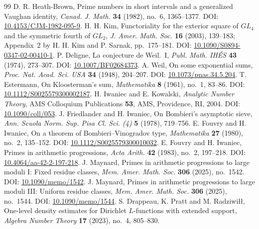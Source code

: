 \documentclass{amsart}
\numberwithin{equation}{section}
\theoremstyle{definition}
\theoremstyle{plain}
\begin{document}
\begin{thebibliography}{99}
 D. R. Heath-Brown,
Prime numbers in short intervals and a generalized Vaughan identity,
\emph{Canad. J. Math.} \textbf{34} (1982), no.~6, 1365--1377.
DOI: \href{https://doi.org/10.4153/CJM-1982-095-9}{10.4153/CJM-1982-095-9}.
 H. H. Kim,
Functoriality for the exterior square of $GL_4$ and the symmetric fourth of $GL_2$,
\emph{J. Amer. Math. Soc.} \textbf{16} (2003), 139--183;
Appendix~2 by H. H. Kim and P. Sarnak, pp.~175--181.
DOI: \href{https://doi.org/10.1090/S0894-0347-02-00410-1}{10.1090/S0894-0347-02-00410-1}.
 P. Deligne, La conjecture de Weil.~I,
\emph{Publ. Math. IH\'ES} \textbf{43} (1974), 273--307.
DOI: \href{https://doi.org/10.1007/BF02684373}{10.1007/BF02684373}.
 A. Weil, On some exponential sums,
\emph{Proc. Nat. Acad. Sci. USA} \textbf{34} (1948), 204--207.
DOI: \href{https://doi.org/10.1073/pnas.34.5.204}{10.1073/pnas.34.5.204}.
 T. Estermann,
On Kloosterman's sum,
\emph{Mathematika} \textbf{8} (1961), no.~1, 83--86.
DOI: \href{https://doi.org/10.1112/S0025579300002187}{10.1112/S0025579300002187}.
 H. Iwaniec and E. Kowalski,
\emph{Analytic Number Theory}, AMS Colloquium Publications \textbf{53},
AMS, Providence, RI, 2004.
DOI: \href{https://doi.org/10.1090/coll/053}{10.1090/coll/053}.
 J. Friedlander and H. Iwaniec,
On Bombieri's asymptotic sieve,
\emph{Ann. Scuola Norm. Sup. Pisa Cl. Sci. (4)} \textbf{5} (1978), 719--756.
 E. Fouvry and H. Iwaniec,
On a theorem of Bombieri--Vinogradov type,
\emph{Mathematika} \textbf{27} (1980), no.~2, 135--152.
DOI: \href{https://doi.org/10.1112/S0025579300010032}{10.1112/S0025579300010032}.
 E. Fouvry and H. Iwaniec,
Primes in arithmetic progressions,
\emph{Acta Arith.} \textbf{42} (1983), no.~2, 197--218.
DOI: \href{https://doi.org/10.4064/aa-42-2-197-218}{10.4064/aa-42-2-197-218}.
 J. Maynard,
Primes in arithmetic progressions to large moduli I: Fixed residue classes,
\emph{Mem. Amer. Math. Soc.} \textbf{306} (2025), no.~1542.
DOI: \href{https://doi.org/10.1090/memo/1542}{10.1090/memo/1542}.
 J. Maynard,
Primes in arithmetic progressions to large moduli III: Uniform residue classes,
\emph{Mem. Amer. Math. Soc.} \textbf{306} (2025), no.~1544.
DOI: \href{https://doi.org/10.1090/memo/1544}{10.1090/memo/1544}.
 S. Drappeau, K. Pratt and M. Radziwi{\l}{\l},
One-level density estimates for Dirichlet $L$-functions with extended support,
\emph{Algebra Number Theory} \textbf{17} (2023), no.~4, 805--830.

\end{thebibliography}
\end{document}
